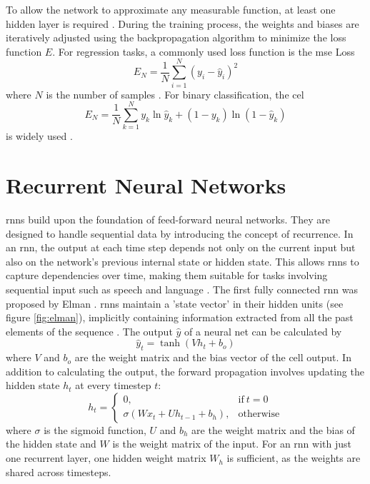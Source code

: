 \documentclass[12pt, a4paper, headinclude, twoside, plainheadsepline, open=right, numbers=noenddot, hidelinks, toc=listof, toc=bibliography]{scrreprt}
\begin{document}
To allow the network to approximate any measurable function, at least one hidden layer is required \cite{hornikMultilayerFeedforwardNetworks1989}.
During the training process, the weights and biases are iteratively adjusted using the backpropagation algorithm to minimize the loss function $E$.
For regression tasks, a commonly used loss function is the \ac{mse} Loss
\begin{equation}
E_N = \frac{1}{N} \sum_{i=1}^{N}(y_{i} - \hat{y}_{i})^2
\end{equation}
where $N$ is the number of samples \cite{lianoRobustErrorMeasure1996}.
 For binary classification, the \ac{cel}
\begin{equation}
E_N = \frac{1}{N} \sum_{k=1}^{N} y_k \ln{\hat{y}_k} + (1-y_k) \ln{(1-\hat{y}_k)}
\end{equation}
is widely used \cite{zhangGeneralizedCrossEntropy2018}.





\section{Recurrent Neural Networks}
\label{sec:rnn}
\Acp{rnn} build upon the foundation of feed-forward neural networks. They are designed to handle sequential data by introducing the concept of recurrence. In an \ac{rnn}, the output at each time step depends not only on the current input but also on the network's previous internal state or hidden state. This allows \acp{rnn} to capture dependencies over time, making them suitable for tasks involving sequential input such as speech and language \cite{lecunDeepLearning2015}.
The first fully connected \ac{rnn} was proposed by Elman \cite{elmanFindingStructureTime1990}.
\Acp{rnn} maintain a 'state vector' in their hidden units (see figure \ref{fig:elman}), implicitly containing information extracted from all the past elements of the sequence \cite{lecunDeepLearning2015}.
The output $\hat{y}$ of a neural net can be calculated by
\begin{equation}
\label{eq:rnn_output}
\hat{y}_t = \tanh(V h_t + b_o)
\end{equation}
where $V$ and $b_o$ are the weight matrix and the bias vector of the cell output.
In addition to calculating the output, the forward propagation involves updating the hidden state $h_t$ at every timestep $t$:
\begin{equation}
\label{eq:rnn_update}
h_t =
\begin{cases}
	0, & \text{if}\ t = 0 \\
	\sigma (W x_t + U h_{t-1} +  b_h), & \text{otherwise}
\end{cases}
\end{equation}
where $\sigma$ is the sigmoid function, $U$ and $b_h$ are the weight matrix and the bias of the hidden state and $W$ is the weight matrix of the input.
For an \ac{rnn} with just one recurrent layer, one hidden weight matrix $W_h$ is sufficient, as the weights are shared across timesteps.
\end{document}
